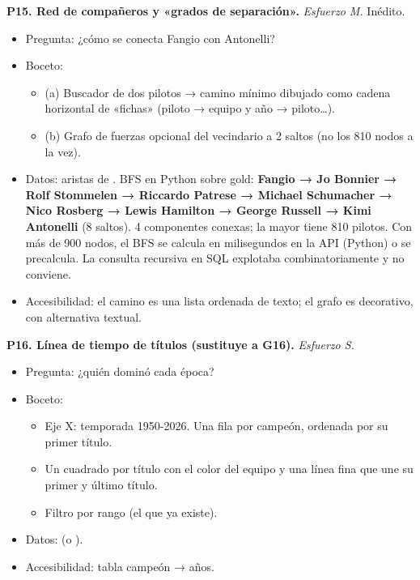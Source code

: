 \textbf{P15. Red de compañeros y «grados de separación».} \emph{Esfuerzo M.} Inédito.

\begin{itemize}
\item Pregunta: ¿cómo se conecta Fangio con Antonelli?
\item Boceto:
\begin{itemize}
\item (a) Buscador de dos pilotos → camino mínimo dibujado como cadena horizontal de «fichas» (piloto → equipo y año → piloto…).
\item (b) Grafo de fuerzas opcional del vecindario a 2 saltos (no los 810 nodos a la vez).
\end{itemize}
\item Datos: aristas de . BFS en Python sobre gold: \textbf{Fangio → Jo Bonnier → Rolf Stommelen → Riccardo Patrese → Michael Schumacher → Nico Rosberg → Lewis Hamilton → George Russell → Kimi Antonelli} (8 saltos). 4 componentes conexas; la mayor tiene 810 pilotos. Con más de 900 nodos, el BFS se calcula en milisegundos en la API (Python) o se precalcula. La consulta recursiva en SQL explotaba combinatoriamente y no conviene.
\item Accesibilidad: el camino es una lista ordenada de texto; el grafo es decorativo, con alternativa textual.
\end{itemize}

\textbf{P16. Línea de tiempo de títulos (sustituye a G16).} \emph{Esfuerzo S.}

\begin{itemize}
\item Pregunta: ¿quién dominó cada época?
\item Boceto:
\begin{itemize}
\item Eje X: temporada 1950-2026. Una fila por campeón, ordenada por su primer título.
\item Un cuadrado por título con el color del equipo y una línea fina que une su primer y último título.
\item Filtro por rango (el que ya existe).
\end{itemize}
\item Datos:  (o ).
\item Accesibilidad: tabla campeón → años.
\end{itemize}

